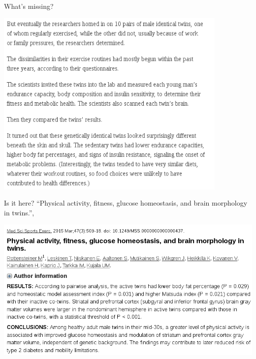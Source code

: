 %
\begin{frame}{What's missing?}
  \begin{center}
    \includegraphics[width=0.85\textwidth]{examples/twins-exercise_news}
  \end{center}
  \flushright\small{}
\end{frame}

%
\begin{frame}{Is it here?}
  {\small
  ``{Physical activity, fitness, glucose homeostasis, and brain morphology in twins.}'', 
  }
  \begin{center}
    \includegraphics[width=\textwidth]{examples/twins-exercise_abstract_results}
  \end{center}
  \flushright\small{}
\end{frame}

